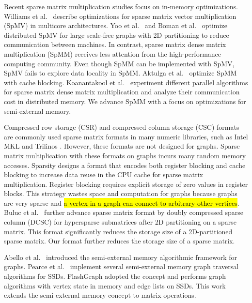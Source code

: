 Recent sparse matrix multiplication studies focus on in-memory optimizations.
Williams et al.~\cite{Williams07} describe optimizations for sparse matrix
vector multiplication (SpMV) in multicore architectures. Yoo et al.~\cite{Yoo11}
and Boman et al.~\cite{Boman2013} optimize distributed SpMV for large
scale-free graphs with 2D partitioning to reduce communication between
machines. In contrast, sparse matrix dense matrix multiplication (SpMM) receives
less attention from the high-performance computing community. Even though
SpMM can be implemented with SpMV, SpMV fails to explore data locality in
SpMM. Aktulga et al.~\cite{Aktulga14} optimize SpMM with cache blocking.
Koanantakool et al.~\cite{Koanantakool16} experiment different parallel
algorithms for sparse matrix dense matrix multiplication and analyze
their communication cost in distributed memory.
We advance SpMM with a focus on optimizations for semi-external memory.

Compressed row storage (CSR) and compressed column storage (CSC) formats are commonly
used sparse matrix formats in many numeric libraries, such as Intel MKL \cite{mkl}
and Trilinos \cite{trilinos}. However, these formats are not designed for graphs.
Sparse matrix multiplication with these formats on graphs incurs many random memory
accesses. %
Sparsity \cite{Im04} designs a format that encodes both register blocking and cache blocking to
increase data reuse in the CPU cache for sparse matrix multiplication. Register blocking
requires explicit storage of zero values in register blocks. This strategy
wastes space and computation for graphs because graphs are very sparse and
\hl{a vertex in a graph can connect to arbitrary other vertices}. Buluc et al.~\cite{Buluc08}
further advance sparse matrix format
by doubly compressed sparse column (DCSC) for hypersparse submatrices after 2D
partitioning on a sparse matrix. This format significantly reduces the storage
size of a 2D-partitioned sparse matrix. Our format further reduces the storage
size of a sparse matrix.

Abello et al.~\cite{Abello98} introduced the semi-external memory algorithmic
framework for graphs. Pearce et al.~\cite{Pearce10} implement several 
semi-external memory graph traversal algorithms for SSDs. FlashGraph
\cite{FlashGraph} adopted the concept and performs graph algorithms with
vertex state in memory and edge lists on SSDs. This work extends the semi-external
memory concept to matrix operations.

